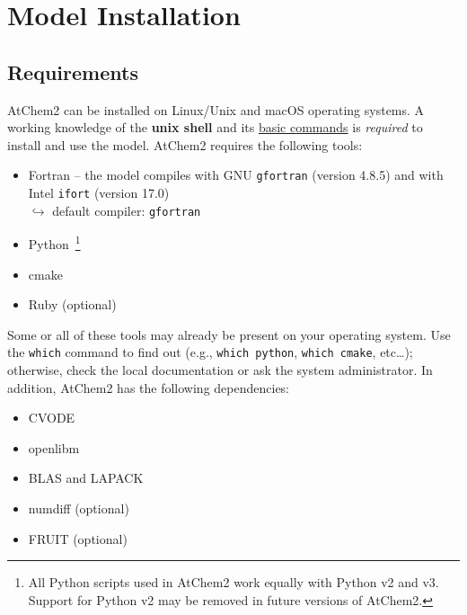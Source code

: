 %
%
%
%

\chapter{Model Installation} \label{ch:installation}

\section{Requirements} \label{sec:requirements}

AtChem2 can be installed on Linux/Unix and macOS operating systems. A
working knowledge of the \textbf{unix shell} and its
\href{https://swcarpentry.github.io/shell-novice/reference/}{basic commands}
is \emph{required} to install and use the model. AtChem2 requires the
following tools:

\begin{itemize}
\item Fortran -- the model compiles with GNU \texttt{gfortran}
  (version 4.8.5) and with Intel \texttt{ifort} (version 17.0)\\
  $\hookrightarrow$ default compiler: \texttt{gfortran}
\item Python~\footnote{All Python scripts used in AtChem2 work equally
    with Python v2 and v3. Support for Python v2 may be removed in
    future versions of AtChem2.}
\item cmake
\item Ruby (optional)
\end{itemize}

Some or all of these tools may already be present on your operating
system. Use the \texttt{which} command to find out (e.g.,
\verb|which python|, \verb|which cmake|, etc\ldots); otherwise, check
the local documentation or ask the system administrator. In addition,
AtChem2 has the following dependencies:

\begin{itemize}
\item CVODE
\item openlibm
\item BLAS and LAPACK
\item numdiff (optional)
\item FRUIT (optional)
\end{itemize}

